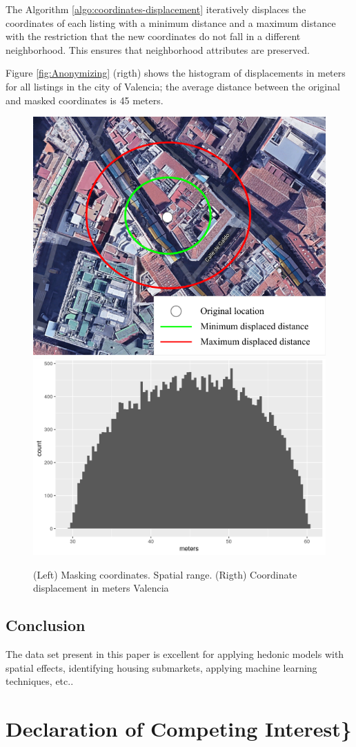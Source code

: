 \documentclass[Royal,times,sageh]{sagej}
\begin{document}
The Algorithm \ref{algo:coordinates-displacement} iteratively displaces
the coordinates of each listing with a minimum distance and a maximum
distance with the restriction that the new coordinates do not fall in a
different neighborhood. This ensures that neighborhood attributes are
preserved.

Figure \ref{fig:Anonymizing} (rigth) shows the histogram of
displacements in meters for all listings in the city of Valencia; the
average distance between the original and masked coordinates is 45
meters.

\begin{figure}

{\centering \includegraphics[width=0.29\linewidth,height=0.2\textheight]{EPB_files/points-moved-image} \includegraphics[width=0.37\linewidth,height=0.2\textheight]{EPB_files/coordinates-valencia} 

}

\caption{\label{fig:Anonymizing}(Left) Masking coordinates. Spatial range. (Rigth) Coordinate displacement in meters Valencia}\label{fig:unnamed-chunk-2}
\end{figure}

\hypertarget{conclusion}{%
\subsection{Conclusion}\label{conclusion}}

The data set present in this paper is excellent for applying hedonic
models with spatial effects, identifying housing submarkets, applying
machine learning techniques, etc..

\hypertarget{declaration-of-competing-interest}{%
\section{Declaration of Competing
Interest\}}\label{declaration-of-competing-interest}}
\end{document}
